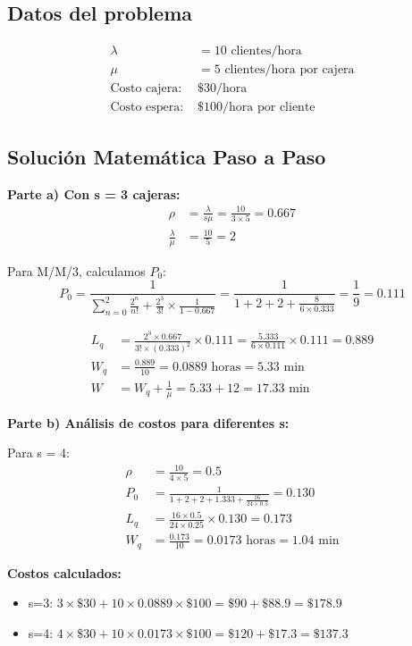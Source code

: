 \documentclass[12pt, a4paper, oneside]{book}
\theoremstyle{definition}
\begin{document}
\begin{center}
\begin{center}
\subsection{Datos del problema}
\begin{align*}
\lambda &= 10 \text{ clientes/hora} \\
\mu &= 5 \text{ clientes/hora por cajera} \\
\text{Costo cajera: } &\$30\text{/hora} \\
\text{Costo espera: } &\$100\text{/hora por cliente}
\end{align*}

\subsection{Solución Matemática Paso a Paso}

\textbf{Parte a) Con s = 3 cajeras:}
\begin{align*}
\rho &= \frac{\lambda}{s \mu} = \frac{10}{3 \times 5} = 0.667 \\
\frac{\lambda}{\mu} &= \frac{10}{5} = 2
\end{align*}

Para M/M/3, calculamos $P_0$:
$$P_0 = \frac{1}{\sum_{n=0}^{2} \frac{2^n}{n!} + \frac{2^3}{3!} \times \frac{1}{1-0.667}} = \frac{1}{1 + 2 + 2 + \frac{8}{6 \times 0.333}} = \frac{1}{9} = 0.111$$

\begin{align*}
L_q &= \frac{2^3 \times 0.667}{3! \times (0.333)^2} \times 0.111 = \frac{5.333}{6 \times 0.111} \times 0.111 = 0.889 \\
W_q &= \frac{0.889}{10} = 0.0889 \text{ horas} = 5.33 \text{ min} \\
W &= W_q + \frac{1}{\mu} = 5.33 + 12 = 17.33 \text{ min}
\end{align*}

\textbf{Parte b) Análisis de costos para diferentes s:}

Para s = 4:
\begin{align*}
\rho &= \frac{10}{4 \times 5} = 0.5 \\
P_0 &= \frac{1}{1 + 2 + 2 + 1.333 + \frac{16}{24 \times 0.5}} = 0.130 \\
L_q &= \frac{16 \times 0.5}{24 \times 0.25} \times 0.130 = 0.173 \\
W_q &= \frac{0.173}{10} = 0.0173 \text{ horas} = 1.04 \text{ min}
\end{align*}

\textbf{Costos calculados:}
\begin{itemize}
\item s=3: $3 \times \$30 + 10 \times 0.0889 \times \$100 = \$90 + \$88.9 = \$178.9$
\item s=4: $4 \times \$30 + 10 \times 0.0173 \times \$100 = \$120 + \$17.3 = \$137.3$
\end{itemize}


\end{center}
\end{center}
\end{document}
